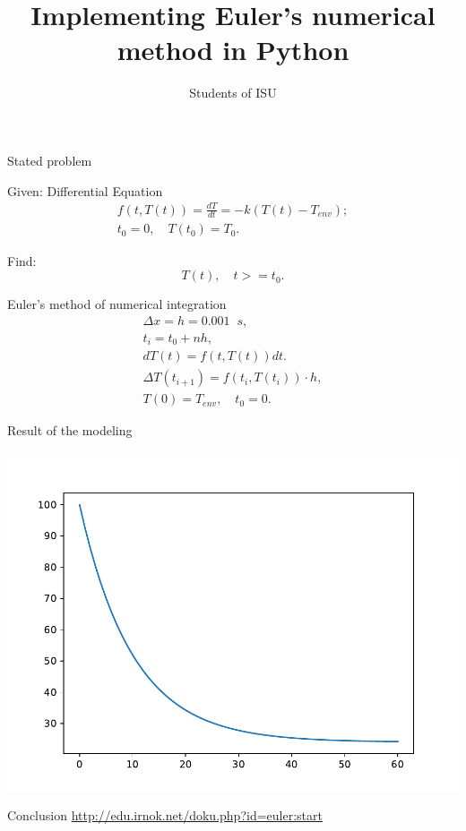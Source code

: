 \documentclass{beamer}
\author{Students of ISU}
\title{Implementing Euler's numerical method in Python}
\begin{document}
\begin{frame}{Stated problem}

  \begin{block}{Given: Differential Equation}
    \begin{eqnarray}
      f(t,T(t)) = \frac{dT}{dt}=-k(T(t)-T_{env}); \\
      \label{du}
      t_0=0, \quad T(t_0)=T_0.
    \end{eqnarray}
  \end{block}

  \begin{block}{Find:}
    \[
      T(t),\quad t>=t_0.
    \]
  \end{block}
\end{frame}
\begin{frame}{Euler's method of numerical integration}
  \begin{eqnarray}
    \Delta x = h = 0.001\;\; s,\\
    t_i = t_0 + nh, \\
    dT(t) = f(t,T(t))dt.\\
    \Delta T (t_{i+1}) = f(t_i,T(t_i))\cdot h,\\
    T(0)=T_{env},\quad t_0=0.
  \end{eqnarray}
\end{frame}

\begin{frame}{Result of the modeling}
  \begin{center}
  \includegraphics[width=0.8\linewidth]{trajectory.pdf}
\end{center}
\end{frame}
\begin{frame}{Conclusion}
  \url{http://edu.irnok.net/doku.php?id=euler:start}
\end{frame}
\end{document}
